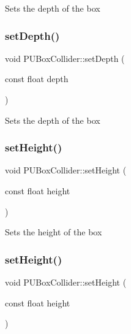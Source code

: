 Sets the depth of the box \mbox{\label{classPUBoxCollider_a932ec7d1d4a2bd823c2ce126ebb1dffe}} 
\subsubsection{\texorpdfstring{set\+Depth()}{setDepth()}\hspace{0.1cm}{\footnotesize\ttfamily [2/2]}}
{\footnotesize\ttfamily void P\+U\+Box\+Collider\+::set\+Depth (\begin{DoxyParamCaption}\item[{const float}]{depth }\end{DoxyParamCaption})}

Sets the depth of the box \mbox{\label{classPUBoxCollider_a810bf05c351a0cdf948b59e3650065c4}} 
\subsubsection{\texorpdfstring{set\+Height()}{setHeight()}\hspace{0.1cm}{\footnotesize\ttfamily [1/2]}}
{\footnotesize\ttfamily void P\+U\+Box\+Collider\+::set\+Height (\begin{DoxyParamCaption}\item[{const float}]{height }\end{DoxyParamCaption})}

Sets the height of the box \mbox{\label{classPUBoxCollider_a810bf05c351a0cdf948b59e3650065c4}} 
\subsubsection{\texorpdfstring{set\+Height()}{setHeight()}\hspace{0.1cm}{\footnotesize\ttfamily [2/2]}}
{\footnotesize\ttfamily void P\+U\+Box\+Collider\+::set\+Height (\begin{DoxyParamCaption}\item[{const float}]{height }\end{DoxyParamCaption})}

